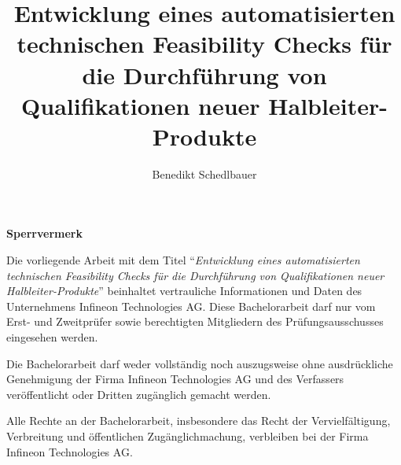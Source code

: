 \documentclass[fontsize=12pt,
parskip=half,	%
department=FakM,  %
twoside, %
DIV=15,BCOR=10mm, %
]{OTHRreprt}
\title{Entwicklung eines automatisierten technischen Feasibility Checks für die Durchführung von Qualifikationen neuer Halbleiter-Produkte}
\author{Benedikt Schedlbauer}
\begin{document}
	\maketitle
	\cleardoublepage

	\thispagestyle{empty} %
	\section*{}
	\vfill %
	\textbf{\Large Sperrvermerk} %
	\vspace{1cm} %

	\noindent %
	\parbox{0.9\textwidth}{ %
		Die vorliegende Arbeit mit dem Titel \enquote{\textit{Entwicklung eines automatisierten technischen Feasibility Checks für die Durchführung von Qualifikationen neuer Halbleiter-Produkte}} beinhaltet vertrauliche Informationen und Daten des Unternehmens Infineon Technologies AG. Diese Bachelorarbeit darf nur vom Erst- und Zweitprüfer sowie berechtigten Mitgliedern des Prüfungsausschusses eingesehen werden.

		\vspace{0.5cm}
		
		Die Bachelorarbeit darf weder vollständig noch auszugsweise ohne ausdrückliche Genehmigung der Firma Infineon Technologies AG und des Verfassers veröffentlicht oder Dritten zugänglich gemacht werden.
		
		\vspace{0.5cm}
		
		Alle Rechte an der Bachelorarbeit, insbesondere das Recht der Vervielfältigung, Verbreitung und öffentlichen Zugänglichmachung, verbleiben bei der Firma Infineon Technologies AG.
	}

	\vfill %
	\cleardoublepage
		

	\cleardoublepage
	\tableofcontents

	
	\cleardoublepage



	


	
	
\end{document}
